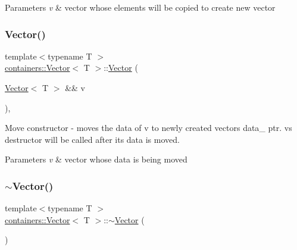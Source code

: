 \begin{DoxyParams}{Parameters}
{\em v} & vector whose elements will be copied to create new vector \\
\hline
\end{DoxyParams}
\mbox{\label{classcontainers_1_1_vector_a2c7dfd50610c1fc054516f18ec8a9452}} 
\subsubsection{\texorpdfstring{Vector()}{Vector()}\hspace{0.1cm}{\footnotesize\ttfamily [5/5]}}
{\footnotesize\ttfamily template$<$typename T $>$ \\
\hyperlink{classcontainers_1_1_vector}{containers\+::\+Vector}$<$ T $>$\+::\hyperlink{classcontainers_1_1_vector}{Vector} (\begin{DoxyParamCaption}\item[{\hyperlink{classcontainers_1_1_vector}{Vector}$<$ T $>$ \&\&}]{v }\end{DoxyParamCaption})\hspace{0.3cm}{\ttfamily [inline]}, {\ttfamily [noexcept]}}

Move constructor -\/ moves the data of {\ttfamily v} to newly created vector\textquotesingle{}s {\ttfamily data\+\_\+} ptr. {\ttfamily v}\textquotesingle{}s destructor will be called after its data is moved.


\begin{DoxyParams}{Parameters}
{\em v} & vector whose data is being moved \\
\hline
\end{DoxyParams}
\mbox{\label{classcontainers_1_1_vector_aa34389ddf377eea569195c234feaef93}} 
\subsubsection{\texorpdfstring{$\sim$\+Vector()}{~Vector()}}
{\footnotesize\ttfamily template$<$typename T $>$ \\
\hyperlink{classcontainers_1_1_vector}{containers\+::\+Vector}$<$ T $>$\+::$\sim$\hyperlink{classcontainers_1_1_vector}{Vector} (\begin{DoxyParamCaption}{ }\end{DoxyParamCaption})\hspace{0.3cm}{\ttfamily [inline]}}

